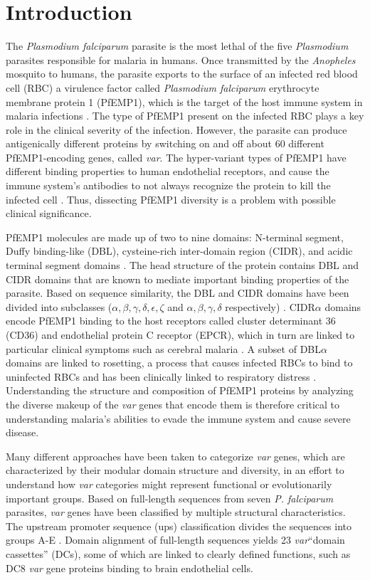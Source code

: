 \documentclass[10pt,twocolumn,superscriptaddress]{revtex4-1}
\newcommand{\var}{{\it var}\xspace}
\newcommand{\pf}{{\it P. falciparum}\xspace}
\newcommand{\dbla}{{DBL$\alpha$}\xspace}
\newcommand{\cidra}{{CIDR$\alpha$}\xspace}
\begin{document}
\section{Introduction} 
The \textit{Plasmodium falciparum} parasite is the most lethal of the five \textit{Plasmodium} parasites responsible for malaria in humans. Once transmitted by the \textit{Anopheles} mosquito to humans, the parasite exports to the surface of an infected red blood cell (RBC) a virulence factor called \textit{Plasmodium falciparum} erythrocyte membrane protein 1 (PfEMP1), which is the target of the host immune system in malaria infections \cite{chan2012}. The type of PfEMP1 present on the infected RBC plays a key role in the clinical severity of the infection. However, the parasite can produce antigenically different proteins by switching on and off about 60 different PfEMP1-encoding genes, called \var \cite{gardner2002}. The hyper-variant types of PfEMP1 have different binding properties to human endothelial receptors, and cause the immune system's antibodies to not always recognize the protein to kill the infected cell \cite{gardner2002}. Thus, dissecting PfEMP1 diversity is a problem with possible clinical significance. 

PfEMP1 molecules are made up of two to nine domains: N-terminal segment, Duffy binding-like (DBL), cysteine-rich inter-domain region (CIDR), and acidic terminal segment domains \cite{rask2010}. The head structure of the protein contains DBL and CIDR domains that are known to mediate important binding properties of the parasite. Based on sequence similarity, the DBL and CIDR domains have been divided into subclasses ($\alpha, \beta, \gamma, \delta, \epsilon , \zeta$ and $\alpha, \beta, \gamma, \delta$ respectively) \cite{rask2010} . \cidra domains encode PfEMP1 binding to the host receptors called cluster determinant 36 (CD36) and endothelial protein C receptor (EPCR), which in turn are linked to particular clinical symptoms such as cerebral malaria \cite{hsieh2016}. A subset of \dbla domains are linked to rosetting, a process that causes infected RBCs to bind to uninfected RBCs and has been clinically linked to respiratory distress \cite{lau2015}. Understanding the structure and composition of PfEMP1 proteins by analyzing the diverse makeup of the \var genes that encode them is therefore critical to understanding malaria's abilities to evade the immune system and cause severe disease. 

Many different approaches have been taken to categorize \var genes, which are characterized by their modular domain structure and diversity, in an effort to understand how \var categories might represent functional or evolutionarily important groups. Based on full-length sequences from seven \pf parasites, \var genes have been classified by multiple structural characteristics. The upstream promoter sequence (ups) classification divides the sequences into groups A-E \cite{rask2010, vazquez2002}. Domain alignment of full-length sequences yields 23 \var ``domain cassettes'' (DCs), some of which are linked to clearly defined functions, such as DC8 \var gene proteins binding to brain endothelial cells. 
\end{document}
